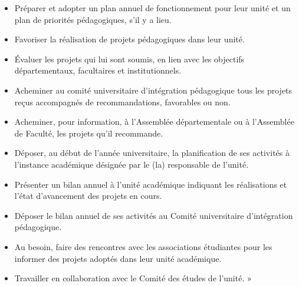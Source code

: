 \documentclass [12 pt]{article}
\begin{document}
        \begin{itemize}
        
                    
        \item Préparer et adopter un plan annuel de fonctionnement pour leur unité et un
                        plan de priorités pédagogiques, s'il y a lieu.
                    
        \item Favoriser la réalisation de projets pédagogiques dans leur unité.
                    
        \item Évaluer les projets qui lui sont soumis, en lien avec les objectifs
                        départementaux, facultaires et institutionnels.
                    
        \item Acheminer au comité universitaire d'intégration pédagogique tous les projets
                        reçus accompagnés de recommandations, favorables ou non.
                    
        \item Acheminer, pour information, à l'Assemblée départementale ou à l'Assemblée
                        de Faculté, les projets qu'il recommande.
                    
        \item Déposer, au début de l'année universitaire, la planification de ses
                        activités à l'instance académique désignée par le (la) responsable de
                        l'unité.
                    
        \item Présenter un bilan annuel à l'unité académique indiquant les réalisations et
                        l'état d'avancement des projets en cours.
                    
        \item Déposer le bilan annuel de ses activités au Comité universitaire
                        d'intégration pédagogique.
                    
        \item Au besoin, faire des rencontres avec les associations étudiantes pour les
                        informer des projets adoptés dans leur unité académique.
                    
        \item Travailler en collaboration avec le Comité des études de l'unité. »
                
        \end{itemize}
    
\end{document}
